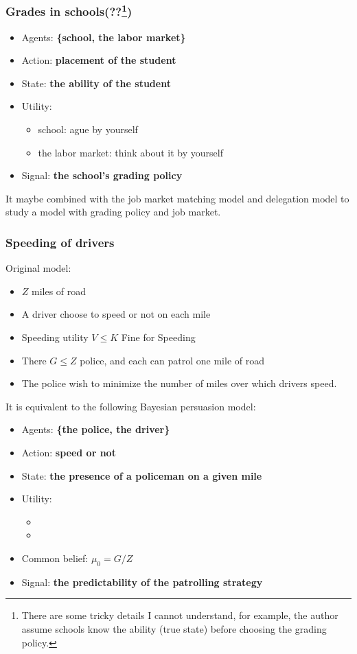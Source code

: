 \documentclass[12pt,letterpaper]{article}
\theoremstyle{definition}   %
\begin{document}
\subsubsection*{Grades in schools(??\footnote{There are some tricky details I cannot understand, for example, the author assume schools know the ability (true state) before choosing the grading policy.})}

\begin{itemize}
	\item Agents: \textbf{\{school, the labor market\}}
	\item Action: \textbf{placement of the student}
	\item State: \textbf{the ability of the student}
	\item Utility:
	      \begin{itemize}
			  \item school: ague by yourself
			  \item the labor market: think about it by yourself
		  \end{itemize}
	\item Signal: \textbf{the school's grading policy} 
\end{itemize}

It maybe combined with the job market matching model \citep{chen2020learning} and delegation model \citep{frankel2014aligned} to study a model with grading policy and job market.

\subsubsection*{Speeding of drivers \citep*{lazear2006speeding}}

Original model:
\begin{itemize}
	\item $Z$ miles of road
	\item A driver choose to speed or not on each mile
	\item Speeding utility $V \leq K$ Fine for Speeding
	\item There $G \leq Z$ police, and each can patrol one mile of road 
	\item The police wish to minimize the number of miles over which drivers speed.
\end{itemize}
It is equivalent to the following Bayesian persuasion model:
\begin{itemize}
	\item Agents: \textbf{\{the police, the driver\}}
	\item Action: \textbf{speed or not}
	\item State: \textbf{the presence of a policeman on a given mile}
	\item Utility:
	      \begin{itemize}
			  \item 
			  \item 
		  \end{itemize}
	\item Common belief: $\mu_0 = G/Z$
	\item Signal: \textbf{the predictability of the patrolling strategy} 
\end{itemize}
\end{document}
